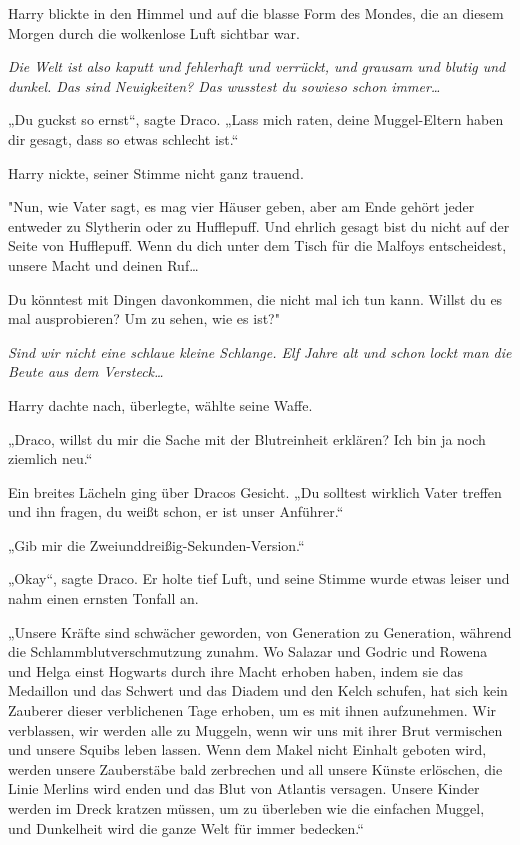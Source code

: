 {Harry blickte in den Himmel und auf die blasse Form des Mondes, die an diesem Morgen durch die wolkenlose Luft sichtbar war.

\emph{Die Welt ist also kaputt und fehlerhaft und verrückt, und grausam und blutig und dunkel. Das sind Neuigkeiten? Das wusstest du sowieso schon immer…}

„Du guckst so ernst“, sagte Draco. „Lass mich raten, deine Muggel-Eltern haben dir gesagt, dass so etwas schlecht ist.“

Harry nickte, seiner Stimme nicht ganz trauend.

"Nun, wie Vater sagt, es mag vier Häuser geben, aber am Ende gehört jeder entweder zu Slytherin oder zu Hufflepuff. Und ehrlich gesagt bist du nicht auf der Seite von Hufflepuff. Wenn du dich unter dem Tisch für die Malfoys entscheidest, unsere Macht und deinen Ruf…

Du könntest mit Dingen davonkommen, die nicht mal ich tun kann. Willst du es mal ausprobieren? Um zu sehen, wie es ist?"

\emph{Sind wir nicht eine schlaue kleine Schlange. Elf Jahre alt und schon lockt man die Beute aus dem Versteck…}

Harry dachte nach, überlegte, wählte seine Waffe.

„Draco, willst du mir die Sache mit der Blutreinheit erklären? Ich bin ja noch ziemlich neu.“

Ein breites Lächeln ging über Dracos Gesicht. „Du solltest wirklich Vater treffen und ihn fragen, du weißt schon, er ist unser Anführer.“

„Gib mir die Zweiunddreißig-Sekunden-Version.“

„Okay“, sagte Draco. Er holte tief Luft, und seine Stimme wurde etwas leiser und nahm einen ernsten Tonfall an.

„Unsere Kräfte sind schwächer geworden, von Generation zu Generation, während die Schlammblutverschmutzung zunahm. Wo Salazar und Godric und Rowena und Helga einst Hogwarts durch ihre Macht erhoben haben, indem sie das Medaillon und das Schwert und das Diadem und den Kelch schufen, hat sich kein Zauberer dieser verblichenen Tage erhoben, um es mit ihnen aufzunehmen. Wir verblassen, wir werden alle zu Muggeln, wenn wir uns mit ihrer Brut vermischen und unsere Squibs leben lassen. Wenn dem Makel nicht Einhalt geboten wird, werden unsere Zauberstäbe bald zerbrechen und all unsere Künste erlöschen, die Linie Merlins wird enden und das Blut von Atlantis versagen. Unsere Kinder werden im Dreck kratzen müssen, um zu überleben wie die einfachen Muggel, und Dunkelheit wird die ganze Welt für immer bedecken.“

}
